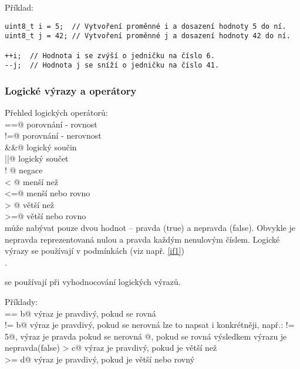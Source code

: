 Příklad:
\begin{verbatim}
uint8_t i = 5;  // Vytvoření proměnné i a dosazení hodnoty 5 do ní.  
uint8_t j = 42; // Vytvoření proměnné j a dosazení hodnoty 42 do ní. 

++i;  // Hodnota i se zvýší o jedničku na číslo 6.
--j;  // Hodnota j se sníží o jedničku na číslo 41.
\end{verbatim}



\subsubsection{Logické výrazy a operátory} \label{logika1}

Přehled logických operátorů: \\
\verb@==@ porovnání - rovnost \\ 
\verb@!=@ porovnání - nerovnost \\
\verb@&&@ logický součin \\ 
\verb@||@ logický součet \\
\verb@! @ negace \\ 
\verb@< @ menší než \\
\verb@<=@ menší nebo rovno \\
\verb@> @ větší než \\
\verb@>=@ větší nebo rovno \\


 může nabývat pouze dvou hodnot -- pravda (true) a nepravda (false).  
Obvykle je nepravda reprezentovaná nulou a pravda každým nenulovým číslem. Logické výrazy se používají v podmínkách (viz např. \ref{if1})\\.

   se používají při vyhodnocování logických výrazů.    

Příklady: \\
\verb@a == b@ výraz je pravdivý, pokud se \verb@a@ rovná \verb@b@ \\
\verb@a != b@ výraz je pravdivý, pokud se \verb@a@ nerovná \verb@b@ 
lze to napsat i konkrétněji, např.: \verb@a != 5@, výraz je pravda pokud se \verb@a@ nerovná @, pokud se rovná výsledkem výrazu je nepravda(false)
\verb@b > c@ výraz je pravdivý, pokud je \verb@b@ větší než \verb@c@ \\
\verb@b >= d@ výraz je pravdivý, pokud je \verb@b@ větší nebo rovný \verb@d@ \\

